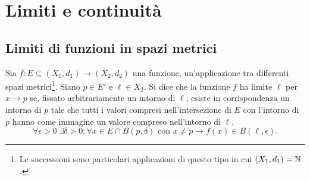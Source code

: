 \chapter{Limiti e continuità}
\section{Limiti di funzioni in spazi metrici}
\begin{definizione}
\label{d:limite}
Sia $f\colon E\subseteq(X_1,d_1)\to(X_2,d_2)$ una funzione, un'applicazione tra differenti spazi metrici\footnote{Le successioni sono particolari applicazioni di questo tipo in cui $(X_1,d_1)=\mathbb{N}$.}.
Siano $p\in E'$ e $\ell\in X_2$. Si dice che la funzione $f$ ha limite $\ell$ per $x\to p$ se, fissato arbitrariamente un intorno di $\ell$, esiste in corrispondenza un intorno di $p$ tale che tutti i valori compresi nell'intersezione di $E$ con l'intorno di $p$ hanno come immagine un valore compreso nell'intorno di $\ell$.
\[
\forall\epsilon>0\;\exists\delta>0\colon\forall x\in E\cap B(p,\delta)\text{ con }x\neq p\longrightarrow f(x)\in B(\ell,\epsilon).
\]
\end{definizione}


